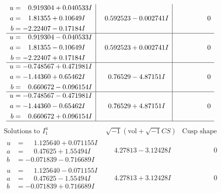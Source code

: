 \documentclass[1p]{elsarticle_modified}
\theoremstyle{definition}
\newcommand{\I}{\sqrt{-1}}
\begin{document}
$$\begin{array}{c|c|c}
\begin{aligned}
u &= \phantom{-}0.919304 + 0.040533 I \\
a &= \phantom{-}1.81355 + 0.10649 I \\
b &= -2.22407 - 0.17184 I\end{aligned}
 & \phantom{-}0.592523 - 0.002741 I & \phantom{-0.000000 } 0 \\ \hline\begin{aligned}
u &= \phantom{-}0.919304 - 0.040533 I \\
a &= \phantom{-}1.81355 - 0.10649 I \\
b &= -2.22407 + 0.17184 I\end{aligned}
 & \phantom{-}0.592523 + 0.002741 I & \phantom{-0.000000 } 0 \\ \hline\begin{aligned}
u &= -0.748567 + 0.471981 I \\
a &= -1.44360 + 0.65462 I \\
b &= \phantom{-}0.660672 - 0.096154 I\end{aligned}
 & \phantom{-}0.76529 - 4.87151 I & \phantom{-0.000000 } 0 \\ \hline\begin{aligned}
u &= -0.748567 - 0.471981 I \\
a &= -1.44360 - 0.65462 I \\
b &= \phantom{-}0.660672 + 0.096154 I\end{aligned}
 & \phantom{-}0.76529 + 4.87151 I & \phantom{-0.000000 } 0\\
 \hline 
 \end{array}$$\newpage$$\begin{array}{c|c|c}  
\text{Solutions to }I^u_{1}& \I (\text{vol} + \sqrt{-1}CS) & \text{Cusp shape}\\
 \hline 
\begin{aligned}
u &= \phantom{-}1.125640 + 0.071155 I \\
a &= \phantom{-}0.47625 + 1.55494 I \\
b &= -0.071839 - 0.716689 I\end{aligned}
 & \phantom{-}4.27813 - 3.12428 I & \phantom{-0.000000 } 0 \\ \hline\begin{aligned}
u &= \phantom{-}1.125640 - 0.071155 I \\
a &= \phantom{-}0.47625 - 1.55494 I \\
b &= -0.071839 + 0.716689 I\end{aligned}
 & \phantom{-}4.27813 + 3.12428 I & \phantom{-0.000000 } 0 \\ \hline\begin{aligned}

\end{aligned}
\end{array}$$
\end{document}
